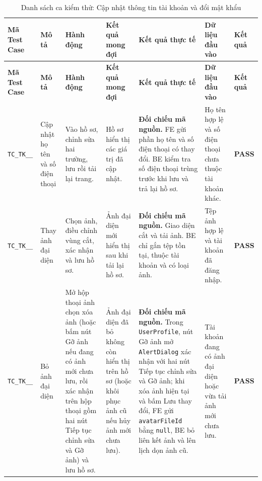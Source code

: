 \begin{landscape}
{
\fontsize{9.5}{11.5}\selectfont
\setlength{\tabcolsep}{3pt}
\renewcommand{\arraystretch}{1.2}
\begin{longtable}{|>{\raggedright\arraybackslash}p{2.1cm}|>{\raggedright\arraybackslash}p{2.8cm}|>{\raggedright\arraybackslash}p{3.8cm}|>{\raggedright\arraybackslash}p{4.0cm}|>{\raggedright\arraybackslash}p{5.0cm}|>{\raggedright\arraybackslash}p{3.2cm}|>{\centering\arraybackslash}p{1.3cm}|}
    \caption{Danh sách ca kiểm thử: Cập nhật thông tin tài khoản và đổi mật khẩu} \label{tab:ts-tk-03} \\
    \hline
    \textbf{Mã Test Case} & \textbf{Mô tả} & \textbf{Hành động} & \textbf{Kết quả mong đợi} & \textbf{Kết quả thực tế} & \textbf{Dữ liệu đầu vào} & \textbf{Kết quả} \\
    \hline
    \endfirsthead
    \hline
    \textbf{Mã Test Case} & \textbf{Mô tả} & \textbf{Hành động} & \textbf{Kết quả mong đợi} & \textbf{Kết quả thực tế} & \textbf{Dữ liệu đầu vào} & \textbf{Kết quả} \\
    \hline
    \endhead
    \hline
    \endfoot
    \hline
    \endlastfoot
    \texttt{TC\_\allowbreak TK\_\allowbreak 03\_\allowbreak 01} & Cập nhật họ tên và số điện thoại & Vào hồ sơ, chỉnh sửa hai trường, lưu rồi tải lại trang. & Hồ sơ hiển thị các giá trị đã cập nhật. & \textbf{Đối chiếu mã nguồn.} FE gửi phần họ tên và số điện thoại có thay đổi. BE kiểm tra số điện thoại trùng trước khi lưu và trả lại hồ sơ. & Họ tên hợp lệ và số điện thoại chưa thuộc tài khoản khác. & \textbf{PASS} \\
    \hline
    \texttt{TC\_\allowbreak TK\_\allowbreak 03\_\allowbreak 02} & Thay ảnh đại diện & Chọn ảnh, điều chỉnh vùng cắt, xác nhận và lưu hồ sơ. & Ảnh đại diện mới hiển thị sau khi tải lại hồ sơ. & \textbf{Đối chiếu mã nguồn.} Giao diện cắt và tải ảnh. BE chỉ gắn tệp tồn tại, thuộc tài khoản và có loại ảnh. & Tệp ảnh hợp lệ và tài khoản đã đăng nhập. & \textbf{PASS} \\
    \hline
    \texttt{TC\_\allowbreak TK\_\allowbreak 03\_\allowbreak 03} & Bỏ ảnh đại diện & Mở hộp thoại ảnh chọn xóa ảnh (hoặc bấm nút Gỡ ảnh nếu đang có ảnh mới chưa lưu, rồi xác nhận trên hộp thoại gồm hai nút Tiếp tục chỉnh sửa và Gỡ ảnh) và lưu hồ sơ. & Ảnh đại diện đã bỏ không còn hiển thị trên hồ sơ (hoặc khôi phục ảnh cũ nếu hủy ảnh mới chưa lưu). & \textbf{Đối chiếu mã nguồn.} Trong \texttt{UserProfile}, nút Gỡ ảnh mở \texttt{AlertDialog} xác nhận với hai nút Tiếp tục chỉnh sửa và Gỡ ảnh; khi xóa ảnh hiện tại và bấm Lưu thay đổi, FE gửi \texttt{avatarFileId} bằng \texttt{null}, BE bỏ liên kết ảnh và lên lịch dọn ảnh cũ. & Tài khoản đang có ảnh đại diện hoặc vừa tải ảnh mới chưa lưu. & \textbf{PASS} \\

\end{longtable}}
\end{landscape}
